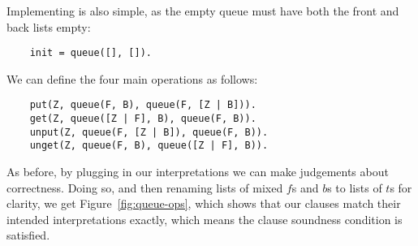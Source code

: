 Implementing  is also simple,
as the empty queue must have both the front and back lists empty:
\begin{verbatim}
    init = queue([], []).
\end{verbatim}
We can define the four main operations as follows:
\begin{verbatim}
    put(Z, queue(F, B), queue(F, [Z | B])).
    get(Z, queue([Z | F], B), queue(F, B)).
    unput(Z, queue(F, [Z | B]), queue(F, B)).
    unget(Z, queue(F, B), queue([Z | F], B)).
\end{verbatim}
As before,
by plugging in our interpretations
we can make judgements about correctness.
Doing so,
and then renaming lists of mixed $f\!$s and $b$s to lists of $t$s for clarity,
we get Figure~\ref{fig:queue-ops},
which shows that our clauses match their intended interpretations exactly,
which means the clause soundness condition is satisfied.
